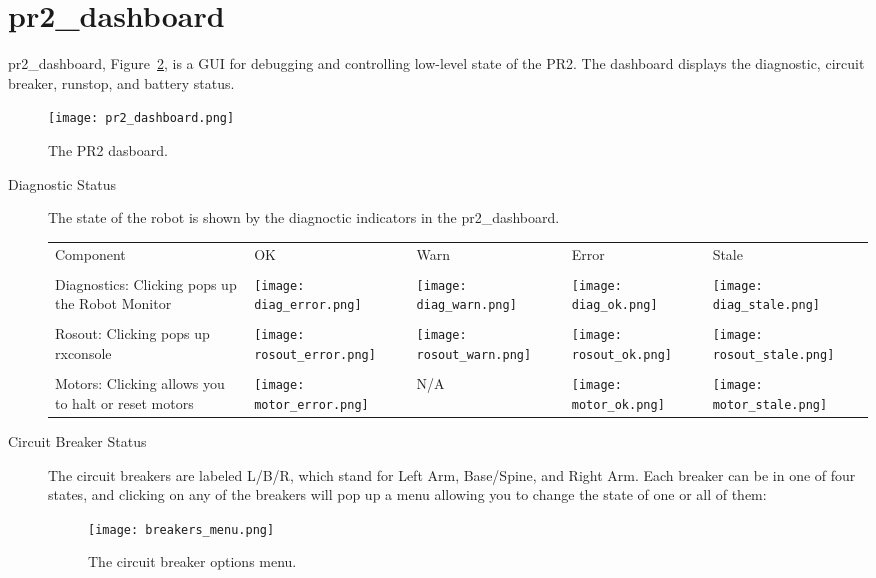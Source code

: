 \section{pr2\_dashboard}
pr2\_dashboard, Figure~\ref{fig:dashboard}, is a GUI for debugging and controlling low-level state of the PR2. The dashboard displays the diagnostic, 
circuit breaker, runstop, and battery status.
\begin{figure}[h]
\centering
\texttt{[image: pr2\_dashboard.png]}
\caption{The PR2 dasboard.}
\label{fig:dashboard}
\end{figure}
\begin{description}
\item[Diagnostic Status] The state of the robot is shown by the diagnoctic indicators in the pr2\_dashboard. \\

    \begin{tabular}{m{6cm}SSSS}
    Component & OK & Warn & Error & Stale\\
    &&&&\\
    Diagnostics: Clicking pops up the Robot Monitor & \texttt{[image: diag\_error.png]}&\texttt{[image: diag\_warn.png]}&
                                                      \texttt{[image: diag\_ok.png]}&\texttt{[image: diag\_stale.png]}\\
    &&&&\\
    Rosout: Clicking pops up rxconsole & \texttt{[image: rosout\_error.png]}&\texttt{[image: rosout\_warn.png]}&
                                        \texttt{[image: rosout\_ok.png]}&\texttt{[image: rosout\_stale.png]}\\
    &&&&\\
    Motors: Clicking allows you to halt or reset motors & \texttt{[image: motor\_error.png]}& N/A &
                                                          \texttt{[image: motor\_ok.png]}&\texttt{[image: motor\_stale.png]}\\
   \end{tabular}

\item[Circuit Breaker Status] The circuit breakers are labeled L/B/R, which stand for Left Arm, Base/Spine, and Right Arm. 
Each breaker can be in one of four states, and clicking on any of the breakers will pop up a menu allowing you to change 
the state of one or all of them:
\begin{figure}[h]
\centering
\texttt{[image: breakers\_menu.png]}
\caption{The circuit breaker options menu.}
\label{fig:dashboard}
\end{figure}


\end{description}

